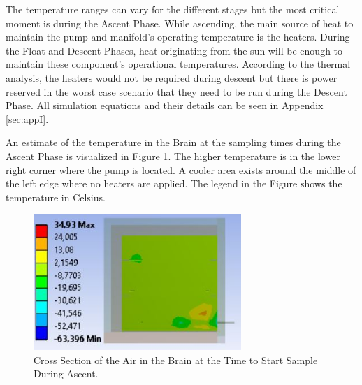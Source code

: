 The temperature ranges can vary for the different stages but the most critical moment is during the Ascent Phase. While ascending, the main source of heat to maintain the pump and manifold's operating temperature is the heaters. During the Float and Descent Phases, heat originating from the sun will be enough to maintain these component's operational temperatures. According to the thermal analysis, the heaters would not be required during descent but there is power reserved in the worst case scenario that they need to be run during the Descent Phase.
All simulation equations and their details can be seen in Appendix \ref{sec:appI}. 

An estimate of the temperature in the Brain at the sampling times during the Ascent Phase is visualized in Figure \ref{fig:Air-in-brain-4-6}. The higher temperature is in the lower right corner where the pump is located. A cooler area exists around the middle of the left edge where no heaters are applied. The legend in the Figure shows the temperature in Celsius.

\begin{figure}[H]
    \centering
    \includegraphics[width=0.7\textwidth]{4-experiment-design/img/Thermal/air-sampling-with-box}
    \caption{Cross Section of the Air in the Brain at the Time to Start Sample During Ascent.}
    \label{fig:Air-in-brain-4-6}
\end{figure}

